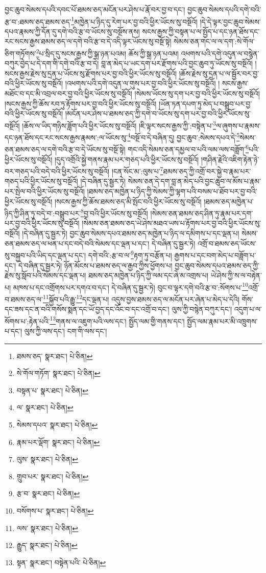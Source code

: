 བྱང་ཆུབ་སེམས་དཔའི་དབང་པོ་ཐམས་ཅད་མངོན་པར་ཤེས་པ་རྣོ་བར་བྱ་བ་དང་། བྱང་ཆུབ་སེམས་དཔའི་དགེ་བའི་རྩ་བ་:ཐམས་ཅད་ཐམས་ཅད་\footnote{ཐམས་ཅད་  སྣར་ཐང་།  པེ་ཅིན། }མཁྱེན་པ་ཉིད་དུ་རེག་པར་བྱ་བའི་ཕྱིར་ཡོངས་སུ་བསྔོའོ། །དེ་དེ་ལྟར་བྱང་ཆུབ་སེམས་དཔའ་རྣམས་ཀྱི་དོན་དུ་དགེ་བའི་རྩ་བ་ཡོངས་སུ་བསྔོས་ནས། སངས་རྒྱས་ཀྱི་བསྟན་པ་ལ་སྤྱོད་པ་དང་ཉན་ཐོས་དང་རང་སངས་རྒྱས་ཐམས་ཅད་ལ་དགེ་བའི་རྩ་བ་དེ་འདི་ལྟར་ཡོངས་སུ་བསྔོ་སྟེ། སེམས་ཅན་གང་ལ་ལ་དག་:སེ་གོལ་ཅིག་གཏོགས་\footnote{སེ་གོལ་གཏོག་  སྣར་ཐང་།  པེ་ཅིན། }པ་སྲིད་དུ་སངས་རྒྱས་ཀྱི་སྒྲ་ཉན་པའམ། ཆོས་ཀྱི་སྒྲ་ཉན་པའམ། འཕགས་པའི་དགེ་འདུན་ལ་བསྙེན་བཀུར་བྱེད་པ་དེ་དག་གི་དགེ་བའི་རྩ་བ་དེ། བླ་ན་མེད་པ་ཡང་དག་པར་རྫོགས་པའི་བྱང་ཆུབ་ཏུ་ཡོངས་སུ་བསྔོའོ། །སངས་རྒྱས་རྗེས་སུ་དྲན་པ་ཡོངས་སུ་རྫོགས་པར་བྱ་བའི་ཕྱིར་ཡོངས་སུ་བསྔོའོ། །ཆོས་རྗེས་སུ་དྲན་པ་ལ་སྦྱོར་བར་བྱ་བའི་ཕྱིར་ཡོངས་སུ་བསྔོའོ། །འཕགས་པའི་དགེ་འདུན་ལ་གུས་པར་བྱ་བའི་ཕྱིར་ཡོངས་སུ་བསྔོའོ། །
སངས་རྒྱས་མཐོང་བ་དང་མི་འབྲལ་བར་བྱ་བའི་ཕྱིར་ཡོངས་སུ་བསྔོའོ། །སེམས་ཡོངས་སུ་དག་པར་བྱ་བའི་ཕྱིར་ཡོངས་སུ་བསྔོའོ། །སངས་རྒྱས་ཀྱི་ཆོས་རབ་ཏུ་རྟོགས་པར་བྱ་བའི་ཕྱིར་ཡོངས་སུ་བསྔོའོ། །ཡོན་ཏན་དཔག་ཏུ་མེད་པ་བསྒྲུབ་པར་བྱ་བའི་ཕྱིར་ཡོངས་སུ་བསྔོའོ། །མངོན་པར་ཤེས་པ་ཐམས་ཅད་ཀྱི་དགེ་བ་ཡོངས་སུ་དག་པར་བྱ་བའི་ཕྱིར་ཡོངས་སུ་བསྔོའོ། །ཆོས་ལ་ཡིད་གཉིས་ཟློག་པའི་ཕྱིར་ཡོངས་སུ་བསྔོའོ། །ཇི་ལྟར་སངས་རྒྱས་ཀྱི་:བསྟེན་པ་\footnote{བསྟན་པ་  སྣར་ཐང་།  པེ་ཅིན། }ལ་ཞུགས་པ་རྣམས་དང་ཉན་ཐོས་དང་རང་སངས་རྒྱས་རྣམས་:ལ་ཡོངས་སུ་\footnote{ལ་  སྣར་ཐང་།  པེ་ཅིན། }བསྔོ་བ་དེ་བཞིན་དུ། བྱང་ཆུབ་:སེམས་དཔའ་དེ་\footnote{སེམས་དཔའ་  སྣར་ཐང་།  པེ་ཅིན། }སེམས་ཅན་ཐམས་ཅད་ལ་དགེ་བའི་རྩ་བ་དེ་ཡོངས་སུ་བསྔོ་སྟེ། གང་འདི་སེམས་ཅན་དམྱལ་བ་པའི་ལམ་ལས་བཟློག་\footnote{རྣམ་པར་ལྡོག་  སྣར་ཐང་།  པེ་ཅིན། }པའི་ཕྱིར་ཡོངས་སུ་བསྔོའོ། །དུད་འགྲོའི་སྐྱེ་གནས་རྣམ་པར་གཅད་པའི་ཕྱིར་ཡོངས་སུ་བསྔོའོ། །གཤིན་རྗེའི་འཇིག་རྟེན་ཉེ་བར་གཅད་པའི་བདེ་བའི་ཕྱིར་ཡོངས་སུ་བསྔོའོ། །ངན་སོང་མ་:ལུས་པ་\footnote{ལུས་  སྣར་ཐང་།  པེ་ཅིན། }ཐམས་ཅད་ཀྱི་འགྲོ་བར་སྐྱེ་བ་རྣམ་པར་གཅད་པའི་ཕྱིར་ཡོངས་སུ་བསྔོའོ། །དེ་བཞིན་དུ་སྦྱར་ཏེ། སེམས་ཅན་དེ་དག་བླ་ན་མེད་པའི་བྱང་ཆུབ་ལ་མོས་པ་རྣམ་པར་སྤེལ་བའི་ཕྱིར་ཡོངས་སུ་བསྔོའོ། །ཐམས་ཅད་མཁྱེན་པ་ཉིད་ཀྱི་སེམས་ཀྱི་ལྷག་པའི་བསམ་པ་ཐོབ་པར་བྱ་བའི་ཕྱིར་ཡོངས་སུ་བསྔོའོ། །སངས་རྒྱས་ཀྱི་ཆོས་ཐམས་ཅད་མི་སྤོང་བའི་ཕྱིར་ཡོངས་སུ་བསྔོའོ། །ཐམས་ཅད་མཁྱེན་པ་ཉིད་ཀྱི་ཤིན་ཏུ་བདེ་བ་:བསྒྲུབ་པར་\footnote{གྲུབ་པར་  སྣར་ཐང་།  པེ་ཅིན། }བྱ་བའི་ཕྱིར་ཡོངས་སུ་བསྔོའོ། །སེམས་ཅན་ཐམས་ཅད་ཤིན་ཏུ་རྣམ་པར་དག་པར་བྱ་བའི་ཕྱིར་ཡོངས་སུ་བསྔོའོ། །སེམས་ཅན་ཐམས་ཅད་ཡེ་ཤེས་མཐའ་ཡས་པ་རྟོགས་པར་བྱ་བའི་ཕྱིར་ཡོངས་སུ་བསྔོའོ། །དེ་བཞིན་དུ་སྦྱར་ཏེ། བྱང་ཆུབ་སེམས་དཔའ་ཐམས་ཅད་མཁྱེན་པ་ཉིད་ལ་དམིགས་པ་དང་ལྡན་པ། སེམས་ཅན་ཐམས་ཅད་ལ་ཕན་པ་དང་བདེ་བའི་སེམས་དང་ལྡན་པ་དང་། དེ་བཞིན་དུ་སྦྱར་ཏེ། འགྲོ་བ་ཐམས་ཅད་ཡོངས་སུ་བསྐྱབ་པའི་ཡིད་དང་ལྡན་པ་དང་། དགེ་བའི་:རྩ་བ་ལ་\footnote{རྩ་བ་  སྣར་ཐང་།  པེ་ཅིན། }རྟག་ཏུ་བརྩོན་པ། རྒྱགས་པ་དང་བག་མེད་པ་བཟློག་པ་དང་། དེ་བཞིན་དུ་སྦྱར་ཏེ། ཉོན་མོངས་པ་ཐམས་ཅད་ལ་རྒྱབ་ཀྱིས་ཕྱོགས་པ། བྱང་ཆུབ་སེམས་དཔའ་ཐམས་ཅད་ཀྱི་རྗེས་སུ་སློབ་པའི་སེམས་དང་ལྡན་པ། ཐམས་ཅད་མཁྱེན་པ་ཉིད་ཀྱི་ལམ་དང་ཞེ་མ་འགྲས་པ། ཡེ་ཤེས་ཀྱི་ས་ལ་བརྟེན་པ། མཁས་པ་དང་འགྲོགས་པར་དགའ་བ་དང་། དེ་བཞིན་དུ་སྦྱར་ཏེ། བུང་བ་ལྟར་དགེ་བའི་རྩ་བ་:སོགས་པ་\footnote{བསོགས་པ་  སྣར་ཐང་།  པེ་ཅིན། }འགྲོ་བ་ཐམས་ཅད་ལ་\footnote{ལས་  སྣར་ཐང་།  པེ་ཅིན། }སྐྱོབ་པའི་རྒྱུ་\footnote{རྒྱུད་  སྣར་ཐང་།  པེ་ཅིན། }དང་ལྡན་པ། འདུས་བྱས་ཐམས་ཅད་ལ་མངོན་པར་ཞེན་པ་མེད་པ་དེའི། གོས་དང་ཟས་དང་ན་བའི་གསོས་སྨན་དང་ཡོ་བྱད་དང་འོང་བ་དང་འགྲོ་བ་དང་། ལུས་ཀྱི་བསྙེན་བཀུར་དང་། འདུག་པ་ལ་སོགས་པ་:རྟེན་པའི་\footnote{སྟན་  སྣར་ཐང་། བསྟེན་པའི་  པེ་ཅིན། }གནས་ལ་འཇུག་པའི་ལས་དང་། སྤྱོད་ལམ་གྱི་གནས་དང་། སྤྱོད་ལམ་རྣམ་པར་མི་འཁྲུགས་པ་དང་། ལུས་ཀྱི་ལས་དང་། ངག་གི་ལས་དང་། 